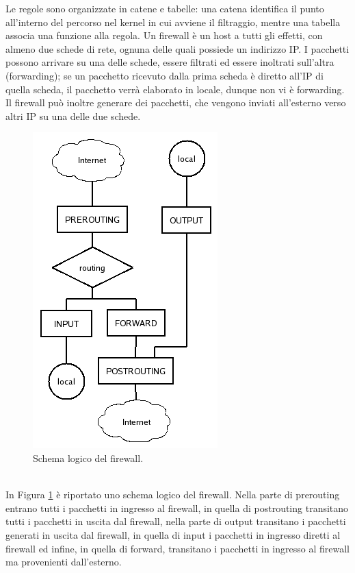 Le regole sono organizzate in catene e tabelle: una catena identifica il punto all'interno del percorso nel kernel in cui avviene il filtraggio, mentre una tabella associa una funzione alla regola. Un firewall è un host a tutti gli effetti, con almeno due schede di rete, ognuna delle quali possiede un indirizzo IP. I pacchetti possono arrivare su una delle schede, essere filtrati ed essere inoltrati sull'altra (forwarding); se un pacchetto ricevuto dalla prima scheda è diretto all'IP di quella scheda, il pacchetto verrà elaborato in locale, dunque non vi è forwarding. Il firewall può inoltre generare dei pacchetti, che vengono inviati all'esterno verso altri IP su una delle due schede.
\begin{figure}[htbp]
	\centering
%		
	\includegraphics[scale = 0.4]{images/firewall-logic-scheme}
	\caption{Schema logico del firewall.}
	\label{img:schema-logico-firewall}
\end{figure}\\
In Figura \ref{img:schema-logico-firewall} è riportato uno schema logico del firewall. Nella parte di prerouting entrano tutti i pacchetti in ingresso al firewall, in quella di postrouting transitano tutti i pacchetti in uscita dal firewall, nella parte di output transitano i pacchetti generati in uscita dal firewall, in quella di input i pacchetti in ingresso diretti al firewall ed infine, in quella di forward, transitano i pacchetti in ingresso al firewall ma provenienti dall'esterno.

